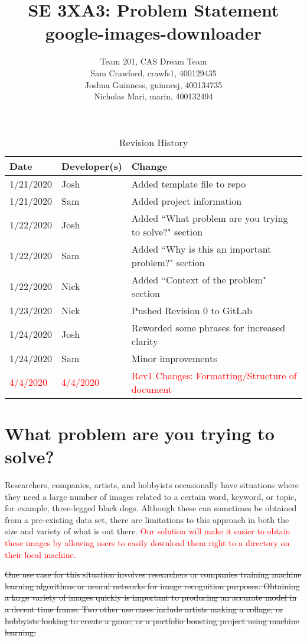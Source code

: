 \documentclass{article}
\title{SE 3XA3: Problem Statement\\google-images-downloader}
\author{Team 201, CAS Dream Team
		\\ Sam Crawford, crawfs1, 400129435
		\\ Joshua Guinness, guinnesj, 400134735
		\\ Nicholas Mari, marin, 400132494
}
\date{}
\begin{document}
\maketitle

\begin{table}
	\caption{Revision History} \label{TblRevisionHistory}
	\begin{tabularx}{\textwidth}{llX}
	\toprule
	\textbf{Date} & \textbf{Developer(s)} & \textbf{Change}\\
	\midrule
	1/21/2020 & Josh & Added template file to repo\\
	1/21/2020 & Sam  & Added project information\\
	1/22/2020 & Josh & Added ``What problem are you trying to solve?" section\\
	1/22/2020 & Sam  & Added ``Why is this an important problem?" section\\
	1/22/2020 & Nick & Added ``Context of the problem" section\\
	1/23/2020 & Nick & Pushed Revision 0 to GitLab\\
	1/24/2020 & Josh & Reworded some phrases for increased clarity\\
	1/24/2020 & Sam  & Minor improvements\\
	\textcolor{red}{4/4/2020} & \textcolor{red}{4/4/2020} & 
	\textcolor{red}{Rev1 Changes: Formatting/Structure of document}\\
	\bottomrule
	\end{tabularx}
\end{table}

\newpage

\section* {What problem are you trying to solve?}


Researchers, companies, artists, and hobbyists occasionally have situations where they need a large number of 
images related to a certain word, keyword, or topic, for example, three-legged black dogs. Although these can 
sometimes be obtained from a pre-existing data set, there are limitations to this approach in both the size 
and variety of what is out there. \textcolor{red}{Our solution will make it easier to obtain these images by
allowing users to easily download them right to a directory on their local machine.}

\sout{One use case for this situation involves researchers or companies training machine learning algorithms or 
neural networks for image recognition purposes. Obtaining a large variety of images quickly is important 
to producing an accurate model in a decent time frame. Two other use cases include artists making a collage, 
or hobbyists looking to create a game, or a portfolio boosting project using machine learning.}
\end{document}
